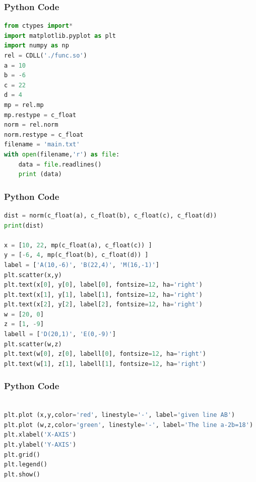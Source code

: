 \documentclass{beamer}
\begin{document}
\begin{frame}[fragile]
  \frametitle{Python Code }

\begin{lstlisting}[language=Python]
from ctypes import*
import matplotlib.pyplot as plt
import numpy as np
rel = CDLL('./func.so')
a = 10
b = -6
c = 22
d = 4
mp = rel.mp
mp.restype = c_float
norm = rel.norm
norm.restype = c_float
filename = 'main.txt'
with open(filename,'r') as file:
    data = file.readlines()
    print (data)


\end{lstlisting}
\end{frame}
\begin{frame}[fragile]
  \frametitle{Python Code }

\begin{lstlisting}[language=Python]
dist = norm(c_float(a), c_float(b), c_float(c), c_float(d)) 
print(dist)

x = [10, 22, mp(c_float(a), c_float(c)) ]
y = [-6, 4, mp(c_float(b), c_float(d)) ]
label = ['A(10,-6)', 'B(22,4)', 'M(16,-1)']
plt.scatter(x,y)
plt.text(x[0], y[0], label[0], fontsize=12, ha='right')
plt.text(x[1], y[1], label[1], fontsize=12, ha='right')
plt.text(x[2], y[2], label[2], fontsize=12, ha='right')
w = [20, 0] 
z = [1, -9]
labell = ['D(20,1)', 'E(0,-9)']
plt.scatter(w,z)
plt.text(w[0], z[0], labell[0], fontsize=12, ha='right')
plt.text(w[1], z[1], labell[1], fontsize=12, ha='right')

\end{lstlisting}
\end{frame}

\begin{frame}[fragile]
\frametitle{Python Code}

\begin{lstlisting}[language=Python]

plt.plot (x,y,color='red', linestyle='-', label='given line AB')
plt.plot (w,z,color='green', linestyle='-', label='The line a-2b=18')
plt.xlabel('X-AXIS')
plt.ylabel('Y-AXIS')
plt.grid()
plt.legend()
plt.show()
\end{lstlisting}
\end{frame}
\end{document}
